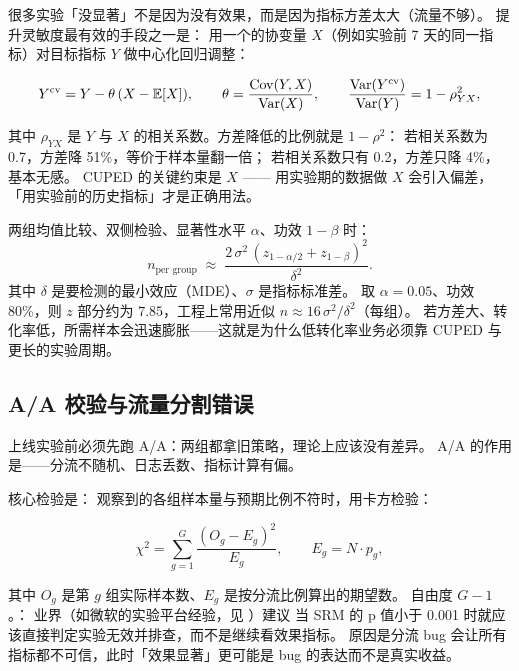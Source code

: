 很多实验「没显著」不是因为没有效果，而是因为指标方差太大（流量不够）。
提升灵敏度最有效的手段之一是：
用一个的协变量 $X$（例如实验前 7 天的同一指标）对目标指标 $Y$ 做中心化回归调整：

\begin{equation}
Y^{\text{cv}} = Y - \theta\,(X - \operatorname{\mathbb{E}}[X]),
\qquad
\theta = \frac{\operatorname{Cov}(Y, X)}{\operatorname{Var}(X)},
\qquad
\frac{\operatorname{Var}(Y^{\text{cv}})}{\operatorname{Var}(Y)} = 1 - \rho_{YX}^{2},
\label{eq:cuped}
\end{equation}

其中 $\rho_{YX}$ 是 $Y$ 与 $X$ 的相关系数。方差降低的比例就是 $1-\rho^2$：
若相关系数为 0.7，方差降 51\%，等价于样本量翻一倍；
若相关系数只有 0.2，方差只降 4\%，基本无感。
CUPED 的关键约束是 $X$ ——
用实验期的数据做 $X$ 会引入偏差，「用实验前的历史指标」才是正确用法。

\begin{formulacard}[实验所需样本量的直觉公式]
两组均值比较、双侧检验、显著性水平 $\alpha$、功效 $1-\beta$ 时：
\begin{equation}
n_{\text{per group}} \;\approx\; \frac{2\,\sigma^{2}\,(z_{1-\alpha/2} + z_{1-\beta})^{2}}{\delta^{2}} .
\end{equation}
其中 $\delta$ 是要检测的最小效应（MDE）、$\sigma$ 是指标标准差。
取 $\alpha=0.05$、功效 80\%，则 $z$ 部分约为 $7.85$，工程上常用近似
$n \approx 16\,\sigma^{2}/\delta^{2}$（每组）。
若方差大、转化率低，所需样本会迅速膨胀——这就是为什么低转化率业务必须靠 CUPED 与更长的实验周期。
\end{formulacard}

\subsection{A/A 校验与流量分割错误}

上线实验前必须先跑 A/A：两组都拿旧策略，理论上应该没有差异。
A/A 的作用是——分流不随机、日志丢数、指标计算有偏。

核心检验是：
观察到的各组样本量与预期比例不符时，用卡方检验：

\begin{equation}
\chi^{2} = \sum_{g=1}^{G} \frac{(O_g - E_g)^{2}}{E_g},
\qquad E_g = N \cdot p_g,
\label{eq:srm-chi2}
\end{equation}

其中 $O_g$ 是第 $g$ 组实际样本数、$E_g$ 是按分流比例算出的期望数。
自由度 $G-1$。：
业界（如微软的实验平台经验，见 \cite{kohavi2020trustworthy}）建议
当 SRM 的 p 值小于 0.001 时就应该直接判定实验无效并排查，而不是继续看效果指标。
原因是分流 bug 会让所有指标都不可信，此时「效果显著」更可能是 bug 的表达而不是真实收益。

